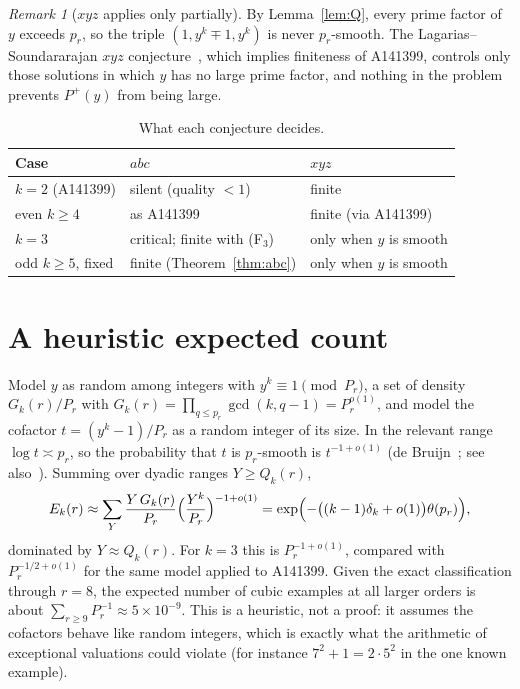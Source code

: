 \documentclass[11pt]{article}
\theoremstyle{definition}
\theoremstyle{remark}
\newtheorem{remark}[theorem]{Remark}
\newcommand{\Pplus}{P^{+}}
\begin{document}
\begin{remark}[$xyz$ applies only partially]
By Lemma~\ref{lem:Q}, every prime factor of $y$ exceeds $p_r$, so the triple
$(1,y^k\mp1,y^k)$ is never $p_r$-smooth. The Lagarias--Soundararajan $xyz$
conjecture~\cite{LS}, which implies finiteness of A141399, controls only those
solutions in which $y$ has no large prime factor, and nothing in the problem
prevents $\Pplus(y)$ from being large.
\end{remark}

\begin{table}[ht]
\centering
\caption{What each conjecture decides.}
\label{tab:status}
\small
\begin{tabular}{@{}lll@{}}
\toprule
Case & $abc$ & $xyz$\\
\midrule
$k=2$ (A141399) & silent (quality $<1$) & finite\\
even $k\ge4$ & as A141399 & finite (via A141399)\\
$k=3$ & critical; finite with (F$_3$) & only when $y$ is smooth\\
odd $k\ge5$, fixed & finite (Theorem~\ref{thm:abc}) & only when $y$ is smooth\\
\bottomrule
\end{tabular}
\end{table}

\section{A heuristic expected count}\label{sec:heuristic}

Model $y$ as random among integers with $y^k\equiv1\pmod{P_r}$, a set of
density $G_k(r)/P_r$ with $G_k(r)=\prod_{q\le p_r}\gcd(k,q-1)=P_r^{o(1)}$, and
model the cofactor $t=(y^k-1)/P_r$ as a random integer of its size. In the
relevant range $\log t\asymp p_r$, so the probability that $t$ is $p_r$-smooth
is $t^{-1+o(1)}$ (de Bruijn~\cite{deBruijn}; see also~\cite{Granville}). Summing over dyadic
ranges $Y\ge Q_k(r)$,
\[
E_k(r)\approx\sum_{Y}\frac{Y\,G_k(r)}{P_r}\Bigl(\frac{Y^k}{P_r}\Bigr)^{-1+o(1)}
=\exp\Bigl(-\bigl((k-1)\delta_k+o(1)\bigr)\theta(p_r)\Bigr),
\]
dominated by $Y\approx Q_k(r)$. For $k=3$ this is $P_r^{-1+o(1)}$, compared
with $P_r^{-1/2+o(1)}$ for the same model applied to A141399. Given the exact
classification through $r=8$, the expected number of cubic examples at all
larger orders is about $\sum_{r\ge9}P_r^{-1}\approx5\times10^{-9}$. This is a
heuristic, not a proof: it assumes the cofactors behave like random integers,
which is exactly what the arithmetic of exceptional valuations could violate
(for instance $7^2+1=2\cdot5^2$ in the one known example).
\end{document}
